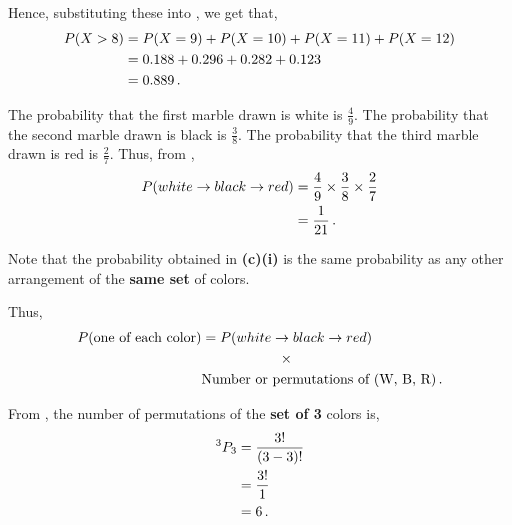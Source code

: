\begin{subquestions}
Hence, substituting these into , we get that,
\begin{align}
P(X > 8) & = P(X=9)+P(X=10)+P(X=11)+P(X=12) \nonumber \\
& = 0.188+0.296+0.282+0.123 \nonumber \\
& = 0.889 \,.      
\end{align}


\subquestion
 
\begin{subsubquestions}
	
\subsubquestion

The probability that the first marble drawn is white is $\frac{4}{9}$. The probability that the second marble drawn is black is $\frac{3}{8}$. The probability that the third marble drawn is red is $\frac{2}{7}$. Thus, from , 
\begin{align}
	P(white \rightarrow black \rightarrow red) & = \frac{4}{9} \times \frac{3}{8} \times \frac{2}{7} \nonumber \\
	                                           & = \frac{1}{21} \,.
\end{align}
	

\subsubquestion

Note that the probability obtained in \textbf{(c)(i)} is the same probability as any other arrangement of the \textbf{same set} of colors. 

Thus,
\begin{align}
	P(\text{one of each color}) & = P(white \rightarrow black \rightarrow red) \nn \\
	& \hspace{20mm}\times \nn\\
	&\text{Number or permutations of (W, B, R)} \,.
\end{align}

From , the number of permutations of the \textbf{set of 3} colors is,
\begin{align}
	^3P_3 & = \frac{3!}{(3-3)!} \nonumber \\
	      & = \frac{3!}{1} \nonumber \\
	      & = 6 \,.
\end{align}


\end{subsubquestions}
\end{subquestions}
